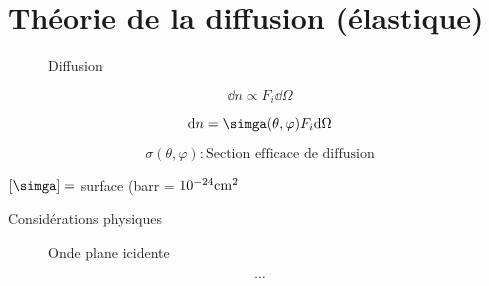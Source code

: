 \section*{Théorie de la diffusion (élastique)}


\begin{figure}[ht]
    \centering
    \caption{Diffusion}
    \label{fig:diffusion}
\end{figure}


$$\dd n \propto F_i \dd \Omega$$ 

$$\dd n = \simga(\theta, \varphi) F_i \dd\Omega$$ 

$$\sigma(\theta, \varphi): \text{Section efficace de diffusion} $$ 

$\left[ \simga \right] = $ surface (barr = $10^{-24}\rm{cm}^2$  

Considérations physiques

\begin{figure}[ht]
    \centering
    \caption{Onde plane icidente}
    \label{fig:onde-plane-icidente}
\end{figure}


$$\dotsb$$ 


